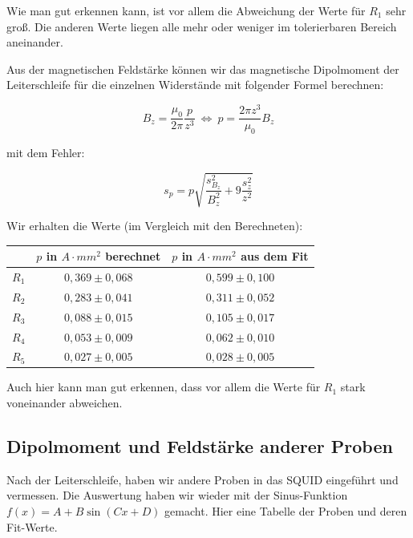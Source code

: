  Wie man gut erkennen kann, ist vor allem die Abweichung der Werte für $R_1$ sehr groß. Die anderen Werte liegen alle mehr oder weniger im tolerierbaren Bereich aneinander.
 
 Aus der magnetischen Feldstärke können wir das magnetische Dipolmoment der Leiterschleife für die einzelnen Widerstände mit folgender Formel berechnen:
 
$$ B_z = \frac{\mu_0}{2\pi}\frac{p}{z^3} \ \Leftrightarrow \  p = \frac{2\pi z^3}{\mu_0}B_z $$

mit dem Fehler:

$$s_p = p\sqrt{\frac{s_{B_z}^2}{B_z^2} + 9\frac{s_z^2}{z^2}}$$

Wir erhalten die Werte (im Vergleich mit den Berechneten):

\begin{center}
\begin{tabular}[H]{| c | c | c |} \hline
 & $p$ in $A\cdot mm^2$ berechnet & $p$ in $A\cdot mm^2$ aus dem Fit\\ \hline \hline
 $R_1$ & $0,369 \pm 0,068$ & $0,599\pm 0,100$\\
 $R_2$ & $0,283 \pm 0,041$ & $0,311\pm 0,052$\\
 $R_3$ & $0,088 \pm 0,015$ & $0,105\pm 0,017$\\
 $R_4$ & $0,053 \pm 0,009$ & $0,062\pm 0,010$\\
 $R_5$ & $0,027 \pm 0,005$ & $0,028\pm 0,005$\\ \hline
 \end{tabular}
 \end{center}
 
 Auch hier kann man gut erkennen, dass vor allem die Werte für $R_1$ stark voneinander abweichen.

\subsection{Dipolmoment und Feldstärke anderer Proben}

Nach der Leiterschleife, haben wir andere Proben in das SQUID eingeführt und vermessen. Die Auswertung haben wir wieder mit der Sinus-Funktion $f(x) = A + B\sin(Cx+D)$ gemacht. Hier eine Tabelle der Proben und deren Fit-Werte.

